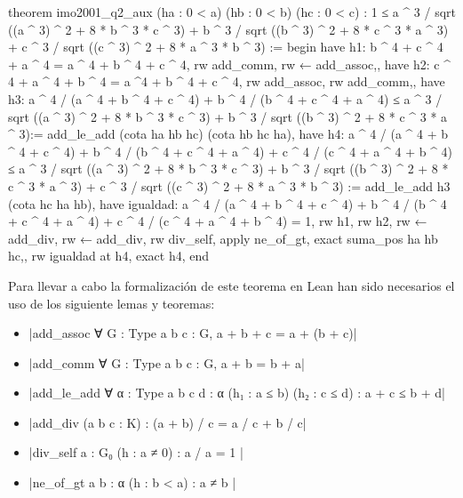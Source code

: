 \begin{leancode}
theorem imo2001_q2_aux (ha : 0 < a) (hb : 0 < b) (hc : 0 < c) :
  1 ≤ a ^ 3 / sqrt ((a ^ 3) ^ 2 + 8 * b ^ 3 * c ^ 3) +
      b ^ 3 / sqrt ((b ^ 3) ^ 2 + 8 * c ^ 3 * a ^ 3) +
      c ^ 3 / sqrt ((c ^ 3) ^ 2 + 8 * a ^ 3 * b ^ 3) :=
begin
  have h1: b ^ 4 + c ^ 4 + a ^ 4 = a ^ 4 + b ^ 4 + c ^ 4,
  {rw add_comm,
   rw ← add_assoc,},
  have h2: c ^ 4 + a ^ 4 + b ^ 4 = a ^4 + b ^ 4 + c ^ 4,
  {rw add_assoc,
   rw add_comm,},
  have h3: a ^ 4 / (a ^ 4 + b ^ 4 + c ^ 4) + 
    b ^ 4 / (b ^ 4 + c ^ 4 + a ^ 4) ≤  
    a ^ 3 / sqrt ((a ^ 3) ^ 2 + 8 * b ^ 3 * c ^ 3) + 
    b ^ 3 / sqrt ((b ^ 3) ^ 2 + 8 * c ^ 3 * a ^ 3):= 
    add_le_add (cota ha hb hc) (cota hb hc ha),
  have h4: a ^ 4 / (a ^ 4 + b ^ 4 + c ^ 4) + 
    b ^ 4 / (b ^ 4 + c ^ 4 + a ^ 4) +
    c ^ 4 / (c ^ 4 + a ^ 4 + b ^ 4) ≤  
    a ^ 3 / sqrt ((a ^ 3) ^ 2 + 8 * b ^ 3 * c ^ 3) + 
    b ^ 3 / sqrt ((b ^ 3) ^ 2 + 8 * c ^ 3 * a ^ 3) +
    c ^ 3 / sqrt ((c ^ 3) ^ 2 + 8 * a ^ 3 * b ^ 3) :=
    add_le_add h3 (cota hc ha hb),
  have igualdad: a ^ 4 / (a ^ 4 + b ^ 4 + c ^ 4) + 
    b ^ 4 / (b ^ 4 + c ^ 4 + a ^ 4) +
    c ^ 4 / (c ^ 4 + a ^ 4 + b ^ 4) = 1,
    {rw h1,
     rw h2,
     rw ← add_div,
     rw ← add_div,
     rw div_self,
     apply ne_of_gt,
     exact suma_pos ha hb hc,},
  rw igualdad at h4,
  exact h4,
end
\end{leancode}

Para llevar a cabo la formalización de este teorema en Lean han sido
necesarios el uso de los siguiente lemas y teoremas:
\begin{itemize}
\item {}|add_assoc ∀ {G : Type} {a b c : G}, a + b + c = a + (b + c)|
\item {}|add_comm ∀ {G : Type} {a b c : G}, a + b  = b + a|
\item {}|add_le_add ∀ {α : Type} {a b c d : α} (h₁ : a ≤ b) (h₂ : c ≤ d) : a + c ≤ b + d|
\item {}|add_div (a b c : K) : (a + b) / c = a / c + b / c|
\item {}|div_self {a : G₀} (h : a ≠ 0) : a / a = 1 |
\item {}|ne_of_gt {a b : α} (h : b < a) : a ≠ b |
\end{itemize}

